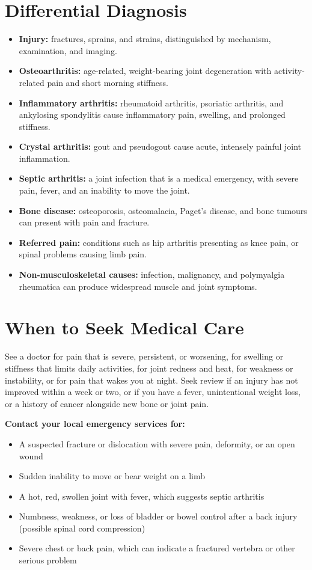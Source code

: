 \section*{Differential Diagnosis}
\begin{itemize}
    \item \textbf{Injury:} fractures, sprains, and strains, distinguished by mechanism, examination, and imaging.
    \item \textbf{Osteoarthritis:} age-related, weight-bearing joint degeneration with activity-related pain and short morning stiffness.
    \item \textbf{Inflammatory arthritis:} rheumatoid arthritis, psoriatic arthritis, and ankylosing spondylitis cause inflammatory pain, swelling, and prolonged stiffness.
    \item \textbf{Crystal arthritis:} gout and pseudogout cause acute, intensely painful joint inflammation.
    \item \textbf{Septic arthritis:} a joint infection that is a medical emergency, with severe pain, fever, and an inability to move the joint.
    \item \textbf{Bone disease:} osteoporosis, osteomalacia, Paget's disease, and bone tumours can present with pain and fracture.
    \item \textbf{Referred pain:} conditions such as hip arthritis presenting as knee pain, or spinal problems causing limb pain.
    \item \textbf{Non-musculoskeletal causes:} infection, malignancy, and polymyalgia rheumatica can produce widespread muscle and joint symptoms.
\end{itemize}

\section*{When to Seek Medical Care}
See a doctor for pain that is severe, persistent, or worsening, for swelling or stiffness that limits daily activities, for joint redness and heat, for weakness or instability, or for pain that wakes you at night. Seek review if an injury has not improved within a week or two, or if you have a fever, unintentional weight loss, or a history of cancer alongside new bone or joint pain.

\textbf{Contact your local emergency services for:}
\begin{itemize}
    \item A suspected fracture or dislocation with severe pain, deformity, or an open wound
    \item Sudden inability to move or bear weight on a limb
    \item A hot, red, swollen joint with fever, which suggests septic arthritis
    \item Numbness, weakness, or loss of bladder or bowel control after a back injury (possible spinal cord compression)
    \item Severe chest or back pain, which can indicate a fractured vertebra or other serious problem
\end{itemize}

